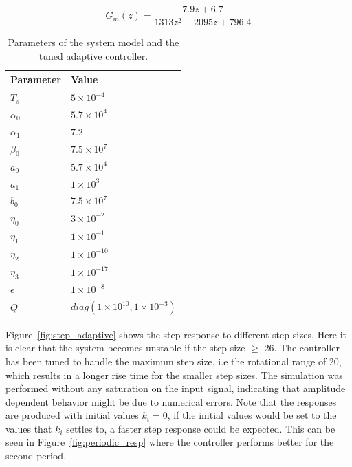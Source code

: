 \begin{equation}
  \label{eq:sys_gm}
  G_m(z) = \frac{7.9z + 6.7}{1313z^{2} - 2095z + 796.4}
\end{equation}

\begin{table}[h!]
  \centering
  \begin{tabular}{| l | l |}
    \hline
    Parameter & Value \\ \hline
    $T_s$ & $5 \times 10^{-4}$ \\
    $\alpha_0$ & $5.7 \times 10^{4}$ \\
    $\alpha_1$ & $7.2$ \\
    $\beta_0$ & $7.5 \times 10^{7}$ \\
    $a_0$ & $5.7 \times 10^{4}$ \\
    $a_1$ & $1 \times 10^{3}$ \\
    $b_0$ & $7.5 \times 10^{7}$ \\
    $\eta_0$ & $3 \times 10^{-2}$ \\
    $\eta_1$ & $1 \times 10^{-1}$ \\
    $\eta_2$ & $1 \times 10^{-10}$ \\
    $\eta_3$ & $1 \times 10^{-17}$ \\
    $\epsilon$ & $1 \times 10^{-8}$ \\
    $Q$ & $diag(1 \times 10^{10}, 1 \times 10^{-3})$\\
    \hline
  \end{tabular}
  \caption{\label{tab:adaptive_param} Parameters of the system model and the tuned adaptive controller.}
\end{table}

Figure~\ref{fig:step_adaptive} shows the step response to different step sizes. Here it is clear that the system becomes unstable if the step size $\geq$ \unit{26}{\milli\radian}. The controller has been tuned to handle the maximum step size, i.e the rotational range of \unit{20}{\milli\radian}, which results in a longer rise time for the smaller step sizes. The simulation was performed without any saturation on the input signal, indicating that amplitude dependent behavior might be due to numerical errors. Note that the responses are produced with initial values $k_i = 0$, if the initial values would be set to the values that $k_i$ settles to, a faster step response could be expected. This can be seen in Figure~\ref{fig:periodic_resp} where the controller performs better for the second period.

